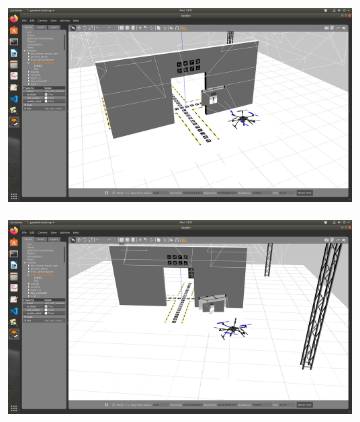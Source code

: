 \documentclass[../Head/report.tex]{subfiles}
\begin{document}
\begin{figure}[H]
    \centering
    \begin{subfigure}[t]{.47\textwidth}
        \centering
        \includegraphics[width=\textwidth]{../Figures/analyse_rolling_average/optimal_pose.png}
        \caption{}
        \label{fig:GPS2Vision_pose_estimation_test2_roll}
    \end{subfigure}
    \hspace{0.5em}
    \begin{subfigure}[t]{.47\textwidth}
        \centering
        \includegraphics[width=\textwidth]{../Figures/analyse_rolling_average/bad_pose.png}
        \caption{}
        \label{fig:GPS2Vision_pose_estimation_test2_pitch}
    \end{subfigure}
    \caption{}
    \label{fig:GPS2Vision_pose_estimation_test2_error_ori}
\end{figure}
\end{document}
